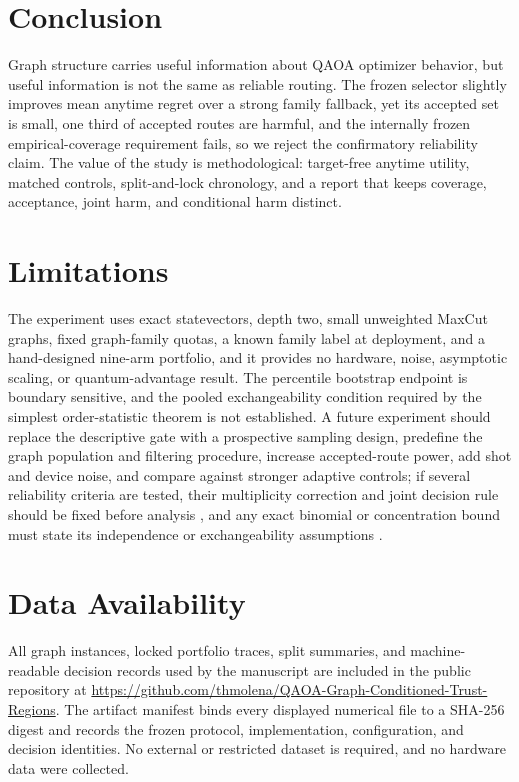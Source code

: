 \documentclass[aps,prx,reprint,superscriptaddress,floatfix]{revtex4-2}
\begin{document}
\section{Conclusion}

Graph structure carries useful information about QAOA optimizer behavior, but
useful information is not the same as reliable routing.  The frozen selector
slightly improves mean anytime regret over a strong family fallback, yet its
accepted set is small, one third of accepted routes are harmful, and the
internally frozen empirical-coverage requirement fails, so we reject the
confirmatory reliability claim.  The value of the study is methodological:
target-free anytime utility, matched controls, split-and-lock chronology, and a
report that keeps coverage, acceptance, joint harm, and conditional harm
distinct.

\section*{Limitations}
The experiment uses exact statevectors, depth two, small unweighted MaxCut
graphs, fixed graph-family quotas, a known family label at deployment, and a
hand-designed nine-arm portfolio, and it provides no hardware, noise, asymptotic
scaling, or quantum-advantage result.  The percentile bootstrap endpoint is
boundary sensitive, and the pooled exchangeability condition required by the
simplest order-statistic theorem is not established.  A future experiment should
replace the descriptive gate with a prospective sampling design, predefine the
graph population and filtering procedure, increase accepted-route power, add shot
and device noise, and compare against stronger adaptive controls; if several
reliability criteria are tested, their multiplicity correction and joint decision
rule should be fixed before analysis \citep{benjamini1995controlling}, and any
exact binomial or concentration bound must state its independence or
exchangeability assumptions \citep{clopper1934fiducial,hoeffding1963probability}.

\section*{Data Availability}
All graph instances, locked portfolio traces, split summaries, and
machine-readable decision records used by the manuscript are included in the
public repository at
\url{https://github.com/thmolena/QAOA-Graph-Conditioned-Trust-Regions}.
The artifact manifest binds every displayed numerical file to a
SHA-256 digest and records the frozen protocol, implementation, configuration,
and decision identities.  No external or restricted dataset is required, and
no hardware data were collected.
\end{document}
